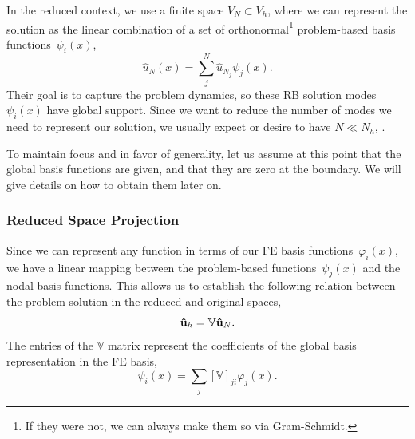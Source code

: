 \documentclass[../../thesis.tex]{subfiles}
\newcommand{\rbV}{\ensuremath{\mathbb{V}}}
\begin{document}
In the reduced context, we use a finite space $V_N \subset V_h$, where we can represent the solution as the linear combination of a set of orthonormal\footnote{If they were not, we can always make them so via Gram-Schmidt.} \mbox{problem-based} basis functions~$\psi_i(x)$,
\begin{equation}
    \hat{u}_N(x) = \sum_j^{N} \hat{u}_{N_j} \psi_j(x).
    \label{eq:1d_rom_burgers_rb_expansion}
\end{equation}
Their goal is to capture the problem dynamics, so these RB solution modes~$\psi_i(x)$ have global support.
Since we want to reduce the number of modes we need to represent our solution, we usually expect or desire to have $N \ll N_h$, . 

To maintain focus and in favor of generality, let us assume at this point that the global basis functions are given, and that they are zero at the boundary.
We will give details on how to obtain them later on.

\subsubsection{Reduced Space Projection}
Since we can represent any function in terms of our FE basis functions~$\varphi_i(x)$, 
we have a linear mapping between the problem-based functions~$\psi_j(x)$ and the nodal basis functions.
This allows us to establish the following relation between the problem solution in the reduced and original spaces,
\begin{equation}
    \label{eq:1d_rom_burgers_projection_relation}
    \vb{\hat{u}}_h = \rbV \vb{\hat{u}}_N.
\end{equation}
The entries of the $\rbV$ matrix represent the coefficients of the global basis representation in the FE basis, 
\begin{equation}
    \psi_i(x) = \sum_j \left[\mathbb{V}\right]_{ji}\varphi_j(x).
\end{equation}

\end{document}

